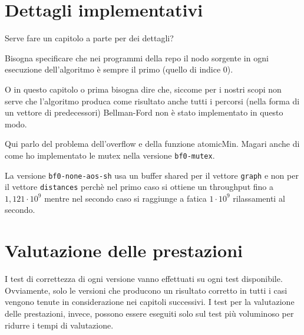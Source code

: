 \documentclass{article}
\begin{document}
	\section{Dettagli implementativi}
	\label{section:impl}
	Serve fare un capitolo a parte per dei dettagli?
	
	Bisogna specificare che nei programmi della repo il nodo sorgente in ogni esecuzione dell'algoritmo è sempre il primo (quello di indice 0).
	
	O in questo capitolo o prima bisogna dire che, siccome per i nostri scopi non serve che l'algoritmo produca come risultato anche tutti i percorsi (nella forma di un vettore di predecessori) Bellman-Ford non è stato implementato in questo modo.
	
	Qui parlo del problema dell'overflow e della funzione atomicMin. Magari anche di come ho implementato le mutex nella versione \texttt{bf0-mutex}.
	
	La versione \texttt{bf0-none-aos-sh} usa un buffer shared per il vettore \texttt{graph} e non per il vettore \texttt{distances} perchè nel primo caso si ottiene un throughput fino a $1,121\cdot 10^9$ mentre nel secondo caso si raggiunge a fatica $1\cdot 10^9$ rilassamenti al secondo.
	
	\section{Valutazione delle prestazioni}
	\label{section:perf}
	I test di correttezza di ogni versione vanno effettuati su ogni test disponibile. Ovviamente, solo le versioni che producono un risultato corretto in tutti i casi vengono tenute in considerazione nei capitoli successivi. I test per la valutazione delle prestazioni, invece, possono essere eseguiti solo sul test più voluminoso per ridurre i tempi di valutazione.
	
\end{document}
